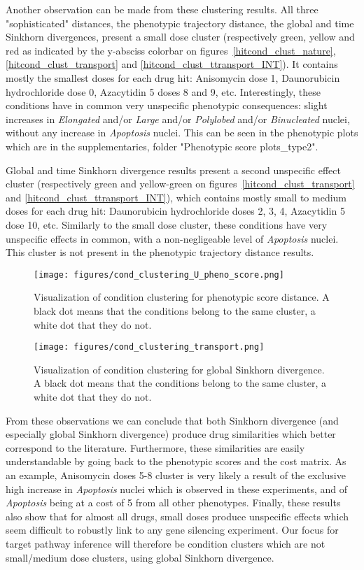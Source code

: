 Another observation can be made from these clustering results. All three "sophisticated" distances, the phenotypic trajectory distance, the global and time Sinkhorn divergences, present a small dose cluster (respectively green, yellow and red as indicated by the y-absciss colorbar on figures~\ref{hitcond_clust_nature}, \ref{hitcond_clust_transport} and \ref{hitcond_clust_ttransport_INT}). It contains mostly the smallest doses for each drug hit: Anisomycin dose 1, Daunorubicin hydrochloride dose 0, Azacytidin 5 doses 8 and 9, etc. Interestingly, these conditions have in common very unspecific phenotypic consequences: slight increases in \textit{Elongated} and/or \textit{Large} and/or \textit{Polylobed} and/or \textit{Binucleated} nuclei, without any increase in \textit{Apoptosis} nuclei. This can be seen in the phenotypic plots which are in the supplementaries, folder "Phenotypic score plots\_type2".

Global and time Sinkhorn divergence results present a second unspecific effect cluster (respectively green and yellow-green on figures~\ref{hitcond_clust_transport} and \ref{hitcond_clust_ttransport_INT}), which contains mostly small to medium doses for each drug hit: Daunorubicin hydrochloride doses 2, 3, 4, Azacytidin 5 dose 10, etc. Similarly to the small dose cluster, these conditions have very unspecific effects in common, with a non-negligeable level of \textit{Apoptosis} nuclei. This cluster is not present in the phenotypic trajectory distance results.

\begin{figure*}[ht!]
\centerline{\texttt{[image: figures/cond\_clustering\_U\_pheno\_score.png]}}
\caption{Visualization of condition clustering for phenotypic score distance. A black dot means that the conditions belong to the same cluster, a white dot that they do not.}
\label{binary_map_ps}
\end{figure*}
\begin{figure*}[ht!]
\centerline{%
\texttt{[image: figures/cond\_clustering\_transport.png]} }
\caption{Visualization of condition clustering for global Sinkhorn divergence. A black dot means that the conditions belong to the same cluster, a white dot that they do not.}
\label{binary_map_transport}
\end{figure*}

From these observations we can conclude that both Sinkhorn divergence (and especially global Sinkhorn divergence) produce drug similarities which better correspond to the literature. Furthermore, these similarities are easily understandable by going back to the phenotypic scores and the cost matrix. As an example, Anisomycin doses 5-8 cluster is very likely a result of the exclusive high increase in \textit{Apoptosis} nuclei which is observed in these experiments, and of \textit{Apoptosis} being at a cost of 5 from all other phenotypes. Finally, these results also show that for almost all drugs, small doses produce unspecific effects which seem difficult to robustly link to any gene silencing experiment. Our focus for target pathway inference will therefore be condition clusters which are not small/medium dose clusters, using global Sinkhorn divergence.

